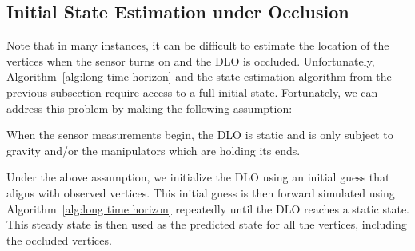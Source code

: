 

\subsection{Initial State Estimation under Occlusion}
\label{sec:initial_state}
Note that in many instances, it can be difficult to estimate the location of the vertices when the sensor turns on and the DLO is occluded.
Unfortunately, Algorithm~\ref{alg:long time horizon} and the state estimation algorithm from the previous subsection require access to a full initial state.
Fortunately, we can address this problem by making the following assumption:
\begin{assum}
When the sensor measurements begin, the DLO is static and is only subject to gravity and/or the manipulators which are holding its ends.
\label{assum: static initial}
\end{assum}
Under the above assumption, we initialize the DLO using an initial guess that aligns with observed vertices.
This initial guess is then forward simulated using Algorithm~\ref{alg:long time horizon} repeatedly until the DLO reaches a static state.
This steady state is then used as the predicted state for all the vertices, including the occluded vertices. 


